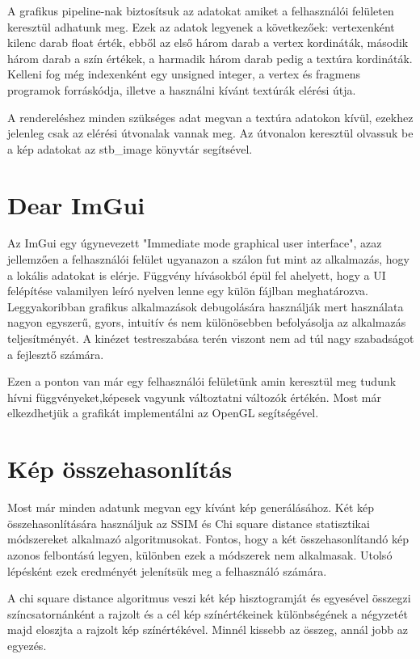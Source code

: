 A grafikus pipeline-nak biztosítsuk az adatokat amiket a felhasználói felületen keresztül adhatunk meg. Ezek az adatok legyenek a következőek: vertexenként kilenc darab float érték, ebből az első három darab a vertex kordináták, második három darab a szín értékek, a harmadik három darab pedig a textúra kordináták. Kelleni fog még indexenként egy unsigned integer, a vertex és fragmens programok forráskódja, illetve a használni kívánt textúrák elérési útja.

A rendereléshez minden szükséges adat megvan a textúra adatokon kívül, ezekhez jelenleg csak az elérési útvonalak vannak meg. Az útvonalon keresztül olvassuk be a kép adatokat az stb\_image könyvtár segítsével.

\section{Dear ImGui}
Az ImGui egy úgynevezett "Immediate mode graphical user interface", azaz jellemzően a felhasználói felület ugyanazon a szálon fut mint az alkalmazás, hogy a lokális adatokat is elérje. Függvény hívásokból épül fel ahelyett, hogy a UI felépítése valamilyen leíró nyelven lenne egy külön fájlban meghatározva. Leggyakoribban grafikus alkalmazások debugolására használják mert használata nagyon egyszerű, gyors, intuitív és nem különösebben befolyásolja az alkalmazás teljesítményét. A kinézet testreszabása terén viszont nem ad túl nagy szabadságot a fejlesztő számára.

Ezen a ponton van már egy felhasználói felületünk amin keresztül meg tudunk hívni függvényeket,képesek vagyunk változtatni változók értékén. Most már elkezdhetjük a grafikát implementálni az OpenGL segítségével.

\section{Kép összehasonlítás}
Most már minden adatunk megvan egy kívánt kép generálásához. Két kép összehasonlítására használjuk az SSIM és Chi square distance statisztikai módszereket alkalmazó algoritmusokat. Fontos, hogy a két összehasonlítandó kép azonos felbontású legyen, különben ezek a módszerek nem alkalmasak. Utolsó lépésként ezek eredményét jelenítsük meg a felhasználó számára.

A chi square distance algoritmus\cite{CSQD} veszi két kép hisztogramját és egyesével összegzi színcsatornánként a rajzolt és a cél kép színértékeinek különbségének a négyzetét majd eloszjta a rajzolt kép színértékével. Minnél kissebb az összeg, annál jobb az egyezés. 

